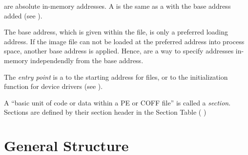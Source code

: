 \begin{definition}[VA]
 are absolute in-memory addresses. A \emph{\VA{}} is the same as a \RVA{} with the base address added (see \cite[]{pespec}). 
\end{definition} 

The base address, which is given within the \PE{} file, is only a preferred loading address. If the image file can not be loaded at the preferred address into process space, another base address is applied. Hence,  are a way to specify addresses in-memory independendly from the base address. 

\begin{definition}\label{def:entrypoint} 
The \emph{entry point} is a \RVA{} to the starting address for \EXE{} files, or to the initialization function for device drivers (see \cite[]{pespec}).
\end{definition}

\begin{definition}[section]
A \enquote{basic unit of code or data within a PE or COFF file} \cite[]{pespec} is called a \emph{section}. Sections are defined by their section header in the Section Table (\cf{} \cite[26]{pespec})
\end{definition} 

\section{General Structure} \label{sec:pestructure}

